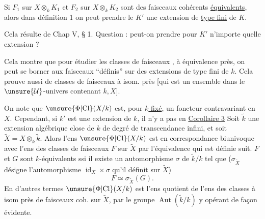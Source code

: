 Si $F_1$ sur $X\otimes_kK_1$ et $F_2$ sur $X\otimes_kK_2$ sont des faisceaux cohérents \uline{équivalents},   alors dans
définition 1 on peut prendre le $K'$ une extension de \uline{type fini} de $K$.

Cela résulte de Chap V, § 1. Question : peut-on prendre pour $K'$ n'importe quelle extension \uline{} ?

Cela montre que pour étudier les  classes de faisceaux , à équivalence près, on peut se borner aux faisceaux ``définis'' sur des extensions de type fini de $k$.
Cela prouve aussi   de classes de faisceaux à isom. près [qui est un ensemble dans le $\unsure{\mathcal U}$-univers   contenant $k,X$]. 

On note que  $\unsure{\Phi|\mathrm{Cl}}(X/k)$ est, pour \uline{$k$ fixé}, un foncteur contravariant en $X$. Cependant, si $k'$ est une extension de $k$, il n'y a pas en
\uline{Corollaire 3} Soit $\widetilde{k}$ une extension algébrique close de $k$ de degré de transcendance infini, et soit $\widetilde X=X\otimes_k\widetilde k$. Alors l'ens $\unsure{\Phi|\mathrm{Cl}}(X/k)$  est en correspondance biunivoque avec l'ens des classes de faisceaux  $F$ sur $\widetilde X$ par l'équivalence  qui est définie  suit. $F$ et $G$ sont $k$-équivalents ssi il existe un automorphisme $\sigma$ de $\widetilde k/k$ tel que ($\sigma_{\widetilde X}$ désigne l'automorphisme $\operatorname{id}_X\times\sigma$ qu'il définit sur $\widetilde X$)
\[
F\simeq\sigma_{\widetilde X}(G).
\]
En d'autres termes $\unsure{\Phi|\mathrm{Cl}}(X/k)$ est l'ens quotient de l'ens des classes à isom près de faisceaux coh. sur $\widetilde X$, par le groupe $\operatorname{Aut}(\widetilde k/k)$ y opérant de façon évidente.

